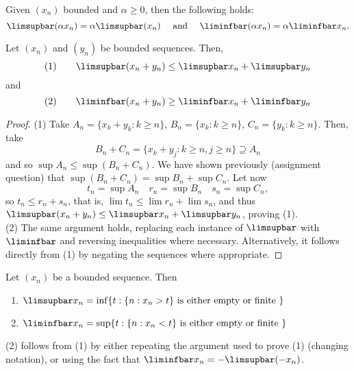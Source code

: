 \documentclass[12pt]{article}
\begin{document}
\begin{remark}
  Given $(x_n)$ bounded and $\alpha \geq 0$, then the following holds:
  \[
  \limsupbar (\alpha x_n) = \alpha \limsupbar(x_n) \quad \text{ and } \quad \liminfbar  (\alpha x_n) = \alpha \liminfbar x_n.
  \]
\end{remark}

\begin{proposition}
  Let $(x_n)$ and $(y_n)$ be bounded sequences. Then, \[
    \text{(1)} \qquad \limsupbar (x_n + y_n) \leq \limsupbar x_n + \limsupbar y_n  
  \]
  and \[
  \text{(2)} \qquad \liminfbar (x_n + y_n) \geq \liminfbar x_n + \liminfbar y_n
  \]
\end{proposition}


\begin{proof}
  (1) Take $A_n = \{x_k + y_k : k \geq n\}$, $B_n = \{x_k : k \geq n\}$, $C_n = \{y_k : k \geq n\}$. Then, take \[
  B_n + C_n = \{x_k + y_j : k \geq n, j \geq n\} \supseteq A_n  
  \]
  and so $\sup A_n \leq \sup (B_n + C_n)$. We have shown previously (assignment question) that $\sup (B_n + C_n) = \sup B_n + \sup C_n$. Let now \[
    t_n = \sup A_n \quad  r_n = \sup B_n \quad s_n = \sup C_n, 
  \]
  so $t_n \leq r_n + s_n$, that is, $\lim t_n \leq \lim r_n + \lim s_n$, and thus $\limsupbar (x_n + y_n) \leq \limsupbar x_n + \limsupbar y_n $, proving (1).\\
  (2) The same argument holds, replacing each instance of $\limsupbar$ with $\liminfbar$ and reversing inequalities where necessary. Alternatively, it follows directly from (1) by negating the sequences where appropriate.
\end{proof}

\begin{proposition}
  Let $(x_n)$ be a bounded sequence. Then \begin{enumerate}
    \item $\limsupbar x_n = \inf \{t : \{n : x_{n} > t\} \text{ is either empty or finite }\}$
    \item $\liminfbar x_n = \sup \{t : \{n : x_n < t\} \text{ is either empty or finite }\}$
  \end{enumerate}
\end{proposition}



\begin{remark}
  (2) follows from (1) by either repeating the argument used to prove (1) (changing notation), or using the fact that $\liminfbar x_n = - \limsupbar (- x_n)$.
\end{remark}
\end{document}
